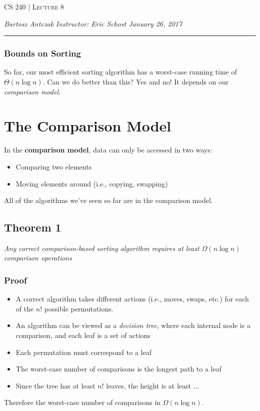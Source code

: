 \documentclass{report}
\newcommand{\lectureNum}{8}
\newcommand{\curDate}{January 26, 2017}
\newcommand{\course}{CS 240}
\begin{document}
\begin{center}
\begin{Large}
\textsc{\course{} | Lecture \lectureNum{}}
\end{Large}
\end{center} 
\noindent \textit{Bartosz Antczak} \hfill
\textit{Instructor: Eric Schost} \hfill
\textit{\curDate{}}
\rule{\textwidth}{0.4pt}

\subsubsection{Bounds on Sorting}
So far, our most efficient sorting algorithm has a worst-case running time of $\Theta(n \log n)$. Can we do better than this? Yes and no! It depends on our \textit{comparison model}.
\section{The Comparison Model}
In the \textbf{comparison model}, data can only be accessed in two ways:
\begin{itemize}
\item Comparing two elements
\item Moving elements around (i.e., copying, swapping)
\end{itemize}
All of the algorithms we've seen so far are in the comparison model.
\subsection{Theorem 1}
\begin{center}
\textit{Any correct comparison-based sorting algorithm requires at least $\Omega(n \log n)$ comparison operations}
\end{center}
\subsubsection{Proof}
\begin{itemize}
\item A correct algorithm takes different actions (i.e., moves, swaps, etc.) for each of the $n!$ possible permutations.
\item An algorithm can be viewed as a \textit{decision tree}, where each internal node is a comparison, and each leaf is a set of actions
\item Each permutation must correspond to a leaf
\item The worst-case number of comparisons is the longest path to a leaf
\item Since the tree has at least $n!$ leaves, the height is at least ...
\end{itemize}
Therefore the worst-case number of comparisons in $\Omega(n \log n)$.
\end{document}
